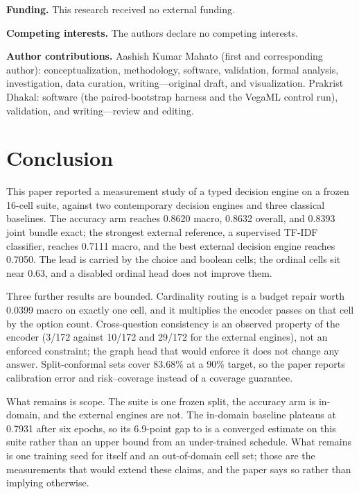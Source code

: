 \textbf{Funding.} This research received no external funding.

\textbf{Competing interests.} The authors declare no competing interests.

\textbf{Author contributions.} Aashish Kumar Mahato (first and corresponding author):
conceptualization, methodology, software,
validation, formal analysis, investigation, data curation, writing---original draft, and
visualization. Prakrist Dhakal: software (the paired-bootstrap harness and the VegaML control
run), validation, and writing---review and editing.

\section{Conclusion}
\label{sec:conclusion}

This paper reported a measurement study of a typed decision engine on a frozen 16-cell suite,
against two contemporary decision engines and three classical baselines. The accuracy arm reaches
0.8620 macro, 0.8632 overall, and 0.8393 joint bundle exact; the strongest external reference, a
supervised TF-IDF classifier, reaches 0.7111 macro, and the best external decision engine reaches
0.7050. The lead is carried by the choice and boolean cells; the ordinal cells sit near 0.63, and a
disabled ordinal head does not improve them.

Three further results are bounded. Cardinality routing is a budget repair worth 0.0399 macro on
exactly one cell, and it multiplies the encoder passes on that cell by the option count.
Cross-question consistency is an observed property of the encoder (3/172 against 10/172 and 29/172
for the external engines), not an enforced constraint; the graph head that would enforce it does not
change any answer. Split-conformal sets cover 83.68\% at a 90\% target, so the paper reports
calibration error and risk--coverage instead of a coverage guarantee.

What remains is scope. The suite is one frozen split, the accuracy arm is in-domain, and the
external engines are not. The in-domain baseline plateaus at 0.7931 after six epochs, so its
6.9-point gap to \vsix{} is a converged estimate on this suite rather than an upper bound from an
under-trained schedule. What remains is one training seed for \vsix{} itself and an out-of-domain
cell set; those are the measurements that would extend these claims, and the paper says so rather
than implying otherwise.
